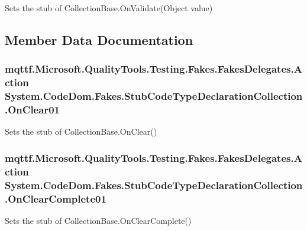Sets the stub of Collection\-Base.\-On\-Validate(\-Object value)



\subsection{Member Data Documentation}
\hypertarget{class_system_1_1_code_dom_1_1_fakes_1_1_stub_code_type_declaration_collection_a836703fd9a16b81275bf4f9aa66c7b57}{
\subsubsection[{On\-Clear01}]{\setlength{\rightskip}{0pt plus 5cm}mqttf.\-Microsoft.\-Quality\-Tools.\-Testing.\-Fakes.\-Fakes\-Delegates.\-Action System.\-Code\-Dom.\-Fakes.\-Stub\-Code\-Type\-Declaration\-Collection.\-On\-Clear01}}\label{class_system_1_1_code_dom_1_1_fakes_1_1_stub_code_type_declaration_collection_a836703fd9a16b81275bf4f9aa66c7b57}


Sets the stub of Collection\-Base.\-On\-Clear()

\hypertarget{class_system_1_1_code_dom_1_1_fakes_1_1_stub_code_type_declaration_collection_af42133ab5e8684e278b01eabb37a3fc9}{
\subsubsection[{On\-Clear\-Complete01}]{\setlength{\rightskip}{0pt plus 5cm}mqttf.\-Microsoft.\-Quality\-Tools.\-Testing.\-Fakes.\-Fakes\-Delegates.\-Action System.\-Code\-Dom.\-Fakes.\-Stub\-Code\-Type\-Declaration\-Collection.\-On\-Clear\-Complete01}}\label{class_system_1_1_code_dom_1_1_fakes_1_1_stub_code_type_declaration_collection_af42133ab5e8684e278b01eabb37a3fc9}


Sets the stub of Collection\-Base.\-On\-Clear\-Complete()

